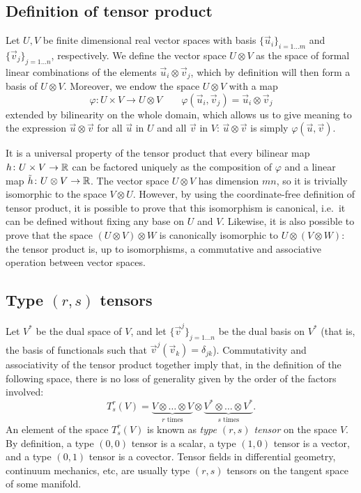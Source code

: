 \subsection*{Definition of tensor product}

Let $U,V$ be finite dimensional real vector spaces with basis
$\{\vec{u}_i\}_{i = 1 \ldots m}$ and $\{\vec{v}_j\}_{j = 1 \ldots n}$, respectively.
We define the vector space $U \otimes V$ as the space of formal
linear combinations of the elements $\vec{u}_i \otimes \vec{v}_j$,
which by definition will then form a basis of $U \otimes V$.
Moreover, we endow the space $U \otimes V$ with a map
\[
\varphi \colon U \times V \to U \otimes V
\qquad
\varphi(\vec{u}_i,\vec{v}_j) = \vec{u}_i \otimes \vec{v}_j
\]
extended by bilinearity on the whole domain,
which allows us to give meaning to the expression $\vec{u} \otimes \vec{v}$
for all $\vec{u}$ in $U$ and all $\vec{v}$ in $V$: $\vec{u} \otimes \vec{v}$
is simply $\varphi(\vec{u},\vec{v})$.

It is a universal property of the tensor product that every bilinear map
$h \colon U \times V \to \mathbb{R}$ can be factored uniquely as the composition of
$\varphi$ and a linear map $\tilde{h} \colon U \otimes V \to \mathbb{R}$.
The vector space $U \otimes V$ has dimension $mn$, so it is trivially isomorphic
to the space $V \otimes U$. However, by using the coordinate-free definition
of tensor product, it is possible to prove that this isomorphism is canonical,
i.e.\ it can be defined without fixing any base on $U$ and $V$.
Likewise, it is also possible to prove that the space $(U \otimes V) \otimes W$
is canonically isomorphic to $U \otimes (V \otimes W)$: the tensor
product is, up to isomorphisms, a commutative and associative operation
between vector spaces.

\subsection*{Type $(r,s)$ tensors}

Let $V^*$ be the dual space of $V$, and let $\{\vec{v}^j\}_{j=1 \dots n}$
be the dual basis on $V^*$ (that is, the basis of functionals such that
$\vec{v}^j(\vec{v}_k) = \delta_{jk}$).
Commutativity and associativity of the tensor product together imply that,
in the definition of the following space, there is no loss of generality
given by the order of the factors involved:
\[
T^r_s(V) = \underbrace{V \otimes \dots \otimes V}_{\text{$r$ times}}
\otimes
\underbrace{V^* \otimes \dots \otimes V^*}_{\text{$s$ times}}.
\]
An element of the space $T_s^r(V)$ is known as \emph{type $(r,s)$ tensor}
on the space $V$. By definition, a type $(0,0)$ tensor is a scalar,
a type $(1,0)$ tensor is a vector, and a type $(0,1)$ tensor is a covector.
Tensor fields in differential geometry, continuum mechanics,
etc, are usually type $(r,s)$ tensors on the tangent space of some manifold.

